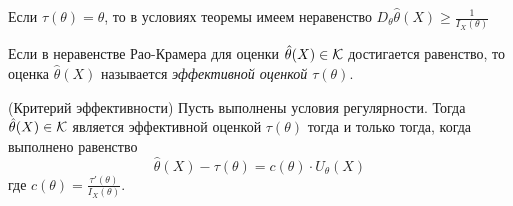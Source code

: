 \begin{corollary}
	Если $\tau(\theta) = \theta$, то в условиях теоремы имеем неравенство $D_\theta \hat{\theta}(X) \ge \frac{1}{I_X(\theta)}$
\end{corollary}

\begin{definition}
	Если в неравенстве Рао-Крамера для оценки $\hat{\theta}(X) \in \mathcal{K}$ достигается равенство, то оценка $\hat{\theta}(X)$ называется \textit{эффективной оценкой $\tau(\theta)$}.
\end{definition}

\begin{theorem} (Критерий эффективности)
	Пусть выполнены условия регулярности. Тогда $\hat{\theta}(X) \in \mathcal{K}$ является эффективной оценкой $\tau(\theta)$ тогда и только тогда, когда выполнено равенство
	\[
		\hat{\theta}(X) - \tau(\theta) = c(\theta) \cdot U_\theta(X)
	\]
	где $c(\theta) = \frac{\tau'(\theta)}{I_X(\theta)}$.
\end{theorem}